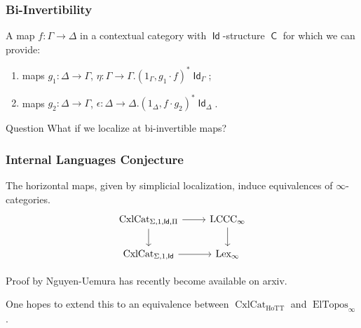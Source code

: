 \documentclass{beamer}
\DeclareMathOperator{\Id}{\mathsf{Id}}
\DeclareMathOperator{\sfC}{\mathsf{C}}
\DeclareMathOperator{\cxl}{CxlCat}
\DeclareMathOperator{\HoTT}{HoTT}
\DeclareMathOperator{\ElTopos}{ElTopos}
\DeclareMathOperator{\lexi}{Lex_\infty}
\DeclareMathOperator{\lccci}{LCCC_\infty}
\begin{document}
\begin{frame}
  \frametitle{Bi-Invertibility}

  \begin{defn}
    A map $f\colon\Gamma\rightarrow\Delta$ in a contextual category with
    $\Id$-structure $\sfC$ for which we can provide:
    \begin{enumerate}
      \item maps $g_1\colon\Delta\rightarrow\Gamma$,
        $\eta\colon\Gamma\rightarrow\Gamma.(1_\Gamma,g_1\cdot f)^*\Id_\Gamma$;
      \item maps $g_2\colon\Delta\rightarrow\Gamma$,
        $\epsilon\colon\Delta\rightarrow\Delta.(1_\Delta,f\cdot g_2)^*\Id_\Delta$.
    \end{enumerate}
  \end{defn}

  \begin{block}{Question}
    What if we localize at bi-invertible maps?
  \end{block}
\end{frame}

\begin{frame}
  \frametitle{Internal Languages Conjecture}

  \begin{conj}
    The horizontal maps, given by simplicial localization, induce
    equivalences of $\infty$-categories.
    \[\begin{tikzcd}[ampersand replacement=\&]
      {\cxl_{\Sigma,1,\Id,\Pi}} \& {\lccci} \\
      {\cxl_{\Sigma,1,\Id}} \& {\lexi}
      \arrow[from=1-1, to=2-1]
      \arrow[from=1-2, to=2-2]
      \arrow[from=2-1, to=2-2]
      \arrow[from=1-1, to=1-2]
    \end{tikzcd}\]
  \end{conj}

  Proof by Nguyen-Uemura has recently become available on arxiv.

  One hopes to extend this to an equivalence between $\cxl_{\HoTT}$ and
  $\ElTopos_\infty$.
\end{frame}
\end{document}
